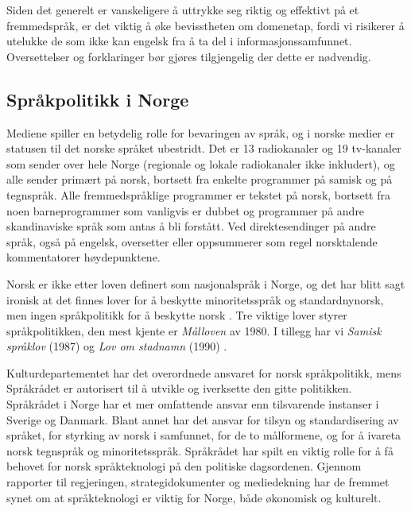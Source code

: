 \begin{multicols}{2}
Siden det generelt er vanskeligere å uttrykke seg riktig og effektivt på et fremmedspråk, er det viktig å øke bevisstheten om domenetap, fordi vi risikerer å utelukke de som ikke kan engelsk fra å ta del i informasjonssamfunnet.
Oversettelser og forklaringer bør gjøres tilgjengelig der dette er nødvendig.

\subsection{Språkpolitikk i Norge}

Mediene spiller en betydelig rolle for bevaringen av språk, og i norske medier er statusen til det norske språket ubestridt. Det er 13 radiokanaler og 19 tv-kanaler som sender over hele Norge (regionale og lokale radiokanaler ikke inkludert), og alle sender primært på norsk, bortsett fra enkelte programmer på samisk og på tegnspråk. 
Alle fremmedspråklige programmer er tekstet på norsk, bortsett fra noen barneprogrammer som vanligvis er dubbet og programmer på andre skandinaviske språk som antas å bli forstått. 
Ved direktesendinger på andre språk, også på engelsk, oversetter eller oppsummerer som regel norsktalende kommentatorer høydepunktene.

Norsk er ikke etter loven definert som nasjonalspråk i Norge, og det har blitt sagt ironisk at det finnes lover for å beskytte minoritetsspråk og standardnynorsk, men ingen språkpolitikk for å beskytte norsk \cite{nih:2005}. 
Tre viktige lover styrer språkpolitikken, den mest kjente er \textit{Målloven} av 1980. I tillegg har vi \textit{Samisk språklov} (1987) og \textit{Lov om stadnamn} (1990) \cite{stm35:2008}.

Kulturdepartementet har det overordnede ansvaret for norsk språkpolitikk, mens Språkrådet er autorisert til å utvikle og iverksette den gitte politikken. Språkrådet i Norge har et mer omfattende ansvar enn tilsvarende instanser i Sverige og Danmark. 
Blant annet har det ansvar for tilsyn og standardisering av språket, for styrking av norsk i samfunnet, for de to målformene, og for å ivareta norsk tegnspråk og minoritetsspråk. 
Språkrådet har spilt en viktig rolle for å få behovet for norsk språkteknologi på den politiske dagsordenen. 
Gjennom rapporter til regjeringen, strategidokumenter og mediedekning har de fremmet synet om at språkteknologi er viktig for Norge, både økonomisk og kulturelt.


\end{multicols}

